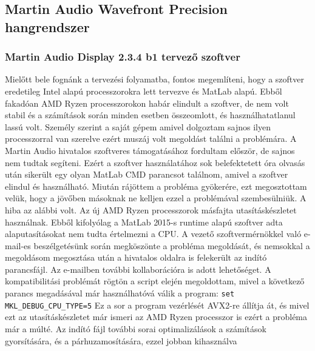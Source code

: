 
\subsection{Martin Audio Wavefront Precision hangrendszer}
\subsubsection{Martin Audio Display 2.3.4 b1 tervező szoftver \cite{DISPLAY23USERGUIDE}}
Mielőtt bele fognánk a tervezési folyamatba, fontos megemlíteni, hogy a szoftver
eredetileg Intel alapú processzorokra lett tervezve és MatLab alapú. Ebből fakadóan
AMD Ryzen processzorokon habár elindult a szoftver, de nem volt stabil és a számítások során
minden esetben összeomlott, és használhatatlanul lassú volt. Személy szerint a saját gépem amivel dolgoztam
sajnos ilyen processzorral van szerelve ezért muszáj volt megoldást találni a problémára.
A Martin Audio hivatalos szoftveres támogatásához fordultam először, de sajnos nem tudtak segíteni.
Ezért a szoftver használatához
sok belefektetett óra olvasás után sikerült egy olyan MatLab CMD parancsot találnom, amivel
a szoftver elindul és használható.
Miután rájöttem a probléma gyökerére, ezt megosztottam velük, hogy a jövőben másoknak ne kelljen
ezzel a problémával szembesülniük.
A hiba az alábbi volt. Az új AMD Ryzen processzorok másfajta utasításkészletet használnak.
Ebből kifolyólag a MatLab 2015-s runtime alapú szoftver adta alaputasításokat nem tudta értelmezni a CPU.
A vezető szoftvermérnökkel való e-mail-es beszélgetésünk során megköszönte a probléma
megoldását, és nemsokkal a megoldásom megosztása után a hivatalos oldalra is felekerült
az indító parancsfájl. Az e-mailben további kollaborációra is adott lehetőséget.
A kompatibilitási problémát rögtön a script elején megoldottam,
mivel a következő parancs megadásával már használhatóvá válik a program: \texttt{set MKL\_DEBUG\_CPU\_TYPE=5} \newline
Ez a sor a program vezérlését AVX2-re állítja át, és mivel ezt az utasításkészletet már ismeri az AMD Ryzen processzor
is ezért a probléma már a múlté.
Az indító fájl további sorai optimalizálások a számítások gyorsítására, és a párhuzamosítására, ezzel jobban kihasználva

